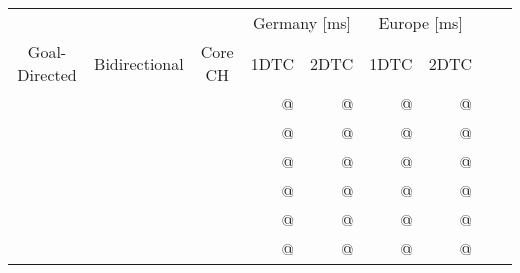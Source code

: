 \begin{tabular}{cccrrrrrr}
	\toprule
	              &               &         & \multicolumn{2}{c}{Germany [\si{\milli\second}]} & \multicolumn{2}{c}{Europe [\si{\milli\second}]}               \\
	Goal-Directed & Bidirectional & Core CH & 1DTC                                             & 2DTC                                            & 1DTC & 2DTC \\
	\midrule
	\xmark        & \xmark        & \xmark  & @                                                & @                                               & @    & @    \\
	\xmark        & \cmark        & \xmark  & @                                                & @                                               & @    & @    \\
	\cmark        & \xmark        & \xmark  & @                                                & @                                               & @    & @    \\
	\cmark        & \cmark        & \xmark  & @                                                & @                                               & @    & @    \\
	\xmark        & \cmark        & \cmark  & @                                                & @                                               & @    & @    \\
	\cmark        & \cmark        & \cmark  & @                                                & @                                               & @    & @    \\
	\bottomrule
\end{tabular}
